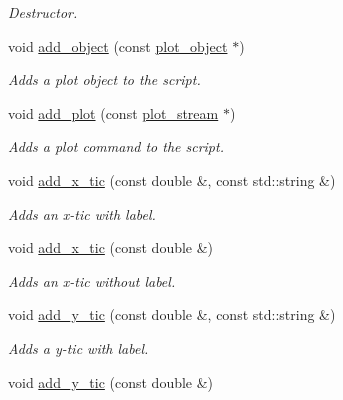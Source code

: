 \begin{DoxyCompactItemize}
\begin{DoxyCompactList}\small\item\em Destructor. \end{DoxyCompactList}\item 
\hypertarget{a00426_a9a10103f30cfc5d8db6498c5c436d515}{void \hyperlink{a00426_a9a10103f30cfc5d8db6498c5c436d515}{add\-\_\-object} (const \hyperlink{a00424}{plot\-\_\-object} $\ast$)}\label{a00426_a9a10103f30cfc5d8db6498c5c436d515}

\begin{DoxyCompactList}\small\item\em Adds a plot object to the script. \end{DoxyCompactList}\item 
\hypertarget{a00426_a399204944beeb0369c9a9e8e4c834468}{void \hyperlink{a00426_a399204944beeb0369c9a9e8e4c834468}{add\-\_\-plot} (const \hyperlink{a00427}{plot\-\_\-stream} $\ast$)}\label{a00426_a399204944beeb0369c9a9e8e4c834468}

\begin{DoxyCompactList}\small\item\em Adds a plot command to the script. \end{DoxyCompactList}\item 
\hypertarget{a00426_a6650a6549d91062dc051cf58e1bcc6f6}{void \hyperlink{a00426_a6650a6549d91062dc051cf58e1bcc6f6}{add\-\_\-x\-\_\-tic} (const double \&, const std\-::string \&)}\label{a00426_a6650a6549d91062dc051cf58e1bcc6f6}

\begin{DoxyCompactList}\small\item\em Adds an x-\/tic with label. \end{DoxyCompactList}\item 
\hypertarget{a00426_ac66b6ca9c55ce3c7bb5564d85de164f1}{void \hyperlink{a00426_ac66b6ca9c55ce3c7bb5564d85de164f1}{add\-\_\-x\-\_\-tic} (const double \&)}\label{a00426_ac66b6ca9c55ce3c7bb5564d85de164f1}

\begin{DoxyCompactList}\small\item\em Adds an x-\/tic without label. \end{DoxyCompactList}\item 
\hypertarget{a00426_ac4aad4ee5ca9db17b6fbd0f2abe19b53}{void \hyperlink{a00426_ac4aad4ee5ca9db17b6fbd0f2abe19b53}{add\-\_\-y\-\_\-tic} (const double \&, const std\-::string \&)}\label{a00426_ac4aad4ee5ca9db17b6fbd0f2abe19b53}

\begin{DoxyCompactList}\small\item\em Adds a y-\/tic with label. \end{DoxyCompactList}\item 
\hypertarget{a00426_a0e3fdc13401799092c51d813ea174fa3}{void \hyperlink{a00426_a0e3fdc13401799092c51d813ea174fa3}{add\-\_\-y\-\_\-tic} (const double \&)}\label{a00426_a0e3fdc13401799092c51d813ea174fa3}


\end{DoxyCompactItemize}
